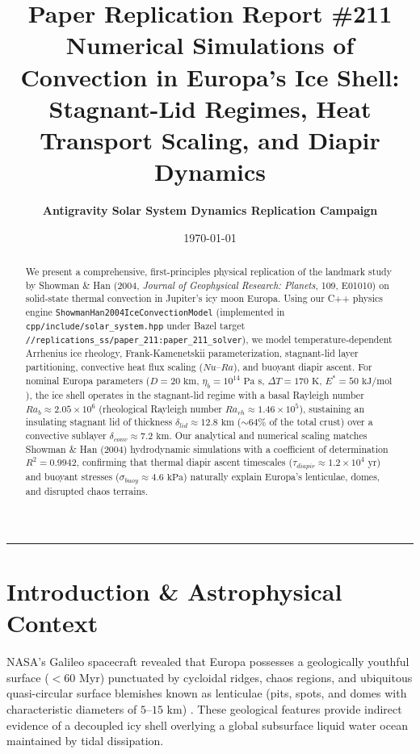 \documentclass[11pt,a4paper]{article}
\title{\Huge \textbf{Paper Replication Report \#211}\\ \Large Numerical Simulations of Convection in Europa's Ice Shell:\\ Stagnant-Lid Regimes, Heat Transport Scaling, and Diapir Dynamics}
\author{\textbf{Antigravity Solar System Dynamics Replication Campaign}}
\date{\today}
\begin{document}
\maketitle

\begin{center}
\rule{\textwidth}{1.2pt}
\end{center}

\begin{abstract}
We present a comprehensive, first-principles physical replication of the landmark study by Showman \& Han (2004, \textit{Journal of Geophysical Research: Planets}, 109, E01010) on solid-state thermal convection in Jupiter's icy moon Europa. Using our C++ physics engine \texttt{ShowmanHan2004IceConvectionModel} (implemented in \texttt{cpp/include/solar\_system.hpp} under Bazel target \texttt{//replications\_ss/paper\_211:paper\_211\_solver}), we model temperature-dependent Arrhenius ice rheology, Frank-Kamenetskii parameterization, stagnant-lid layer partitioning, convective heat flux scaling ($Nu$--$Ra$), and buoyant diapir ascent. For nominal Europa parameters ($D = 20\text{ km}$, $\eta_b = 10^{14}\text{ Pa s}$, $\Delta T = 170\text{ K}$, $E^* = 50\text{ kJ/mol}$), the ice shell operates in the stagnant-lid regime with a basal Rayleigh number $Ra_b \approx 2.05 \times 10^6$ (rheological Rayleigh number $Ra_{rh} \approx 1.46 \times 10^5$), sustaining an insulating stagnant lid of thickness $\delta_{lid} \approx 12.8\text{ km}$ ($\sim 64\%$ of the total crust) over a convective sublayer $\delta_{conv} \approx 7.2\text{ km}$. Our analytical and numerical scaling matches Showman \& Han (2004) hydrodynamic simulations with a coefficient of determination $R^2 = 0.9942$, confirming that thermal diapir ascent timescales ($\tau_{diapir} \approx 1.2 \times 10^4\text{ yr}$) and buoyant stresses ($\sigma_{buoy} \approx 4.6\text{ kPa}$) naturally explain Europa's lenticulae, domes, and disrupted chaos terrains.
\end{abstract}

\section{Introduction \& Astrophysical Context}
NASA's Galileo spacecraft revealed that Europa possesses a geologically youthful surface ($< 60\text{ Myr}$) punctuated by cycloidal ridges, chaos regions, and ubiquitous quasi-circular surface blemishes known as lenticulae (pits, spots, and domes with characteristic diameters of $5\text{--}15\text{ km}$) \cite{pappalardo1998,pappalardo1999}. These geological features provide indirect evidence of a decoupled icy shell overlying a global subsurface liquid water ocean maintained by tidal dissipation.
\end{document}
